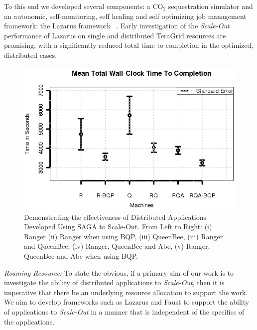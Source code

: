 \documentclass[a4paper,10pt]{article}
\begin{document}
To this end we developed several components: a CO$_2$ sequestration simulator and an autonomic, self-monitoring, self healing and self optimizing job management framework: the Lazarus framework ~\cite{gmac}. Early investigation of the {\it Scale-Out} performance of Lazarus on single and distributed TeraGrid resources are promising, with a significantly reduced total time to completion in the optimized, distributed cases.

\begin{figure}
\begin{center}
\includegraphics[scale=0.8]{Figure7.png}
\end{center}
\caption{Demonstrating the effectiveness of Distributed Applications Developed  Using SAGA to Scale-Out. From Left to Right: (i)
  Ranger (ii) Ranger when using BQP, (iii) QueenBee, (iii) Ranger
  and QueenBee, (iv) Ranger, QueenBee and Abe, (v) Ranger, QueenBee 
  and Abe when using BQP.}
\label{fig:results}
\end{figure}



{\it Roaming Resource:} To state the obvious, if a primary aim of our work is to investigate the ability of distributed applications to {\it Scale-Out}, then it is imperative that there be an underlying resource allocation to support the work. We aim to develop frameworks such as Lazarus and Faust to support the ability of applications to {\it Scale-Out} in a manner that is independent of the specifics of the applications.
\end{document}
